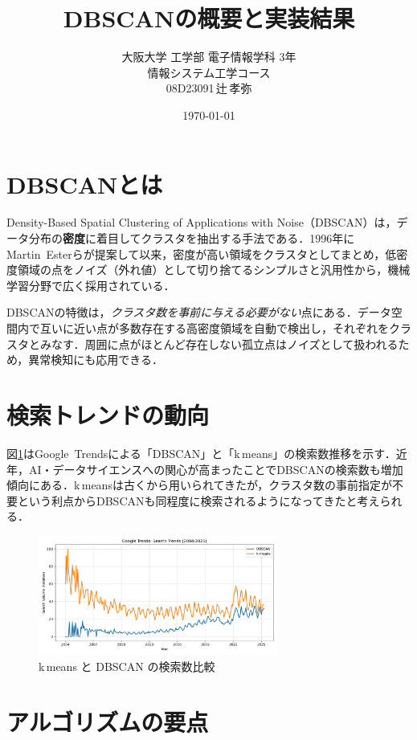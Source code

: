 \documentclass[a4j]{jsarticle}
\title{DBSCANの概要と実装結果}
\author{大阪大学 工学部 電子情報学科 3年\\情報システム工学コース\\08D23091\,辻\,孝弥}
\date{\today}
\begin{document}
\maketitle

\section{DBSCANとは}

Density-Based Spatial Clustering of Applications with Noise（DBSCAN）は，データ分布の\textbf{密度}に着目してクラスタを抽出する手法である．1996年にMartin~Esterらが提案して以来，密度が高い領域をクラスタとしてまとめ，低密度領域の点をノイズ（外れ値）として切り捨てるシンプルさと汎用性から，機械学習分野で広く採用されている．

DBSCANの特徴は，\emph{クラスタ数を事前に与える必要がない}点にある．データ空間内で互いに近い点が多数存在する高密度領域を自動で検出し，それぞれをクラスタとみなす．周囲に点がほとんど存在しない孤立点はノイズとして扱われるため，異常検知にも応用できる．

\section{検索トレンドの動向}
図\ref{fig:trends}はGoogle~Trendsによる「DBSCAN」と「k\,\-means」の検索数推移を示す．近年，AI・データサイエンスへの関心が高まったことでDBSCANの検索数も増加傾向にある．k\,\-meansは古くから用いられてきたが，クラスタ数の事前指定が不要という利点からDBSCANも同程度に検索されるようになってきたと考えられる．

\begin{figure}[htbp]
  \centering
  \includegraphics[width=0.7\textwidth]{trends_comparison.pdf}
  \caption{k\,\-means と DBSCAN の検索数比較}
  \label{fig:trends}
\end{figure}

\section{アルゴリズムの要点}
\end{document}

